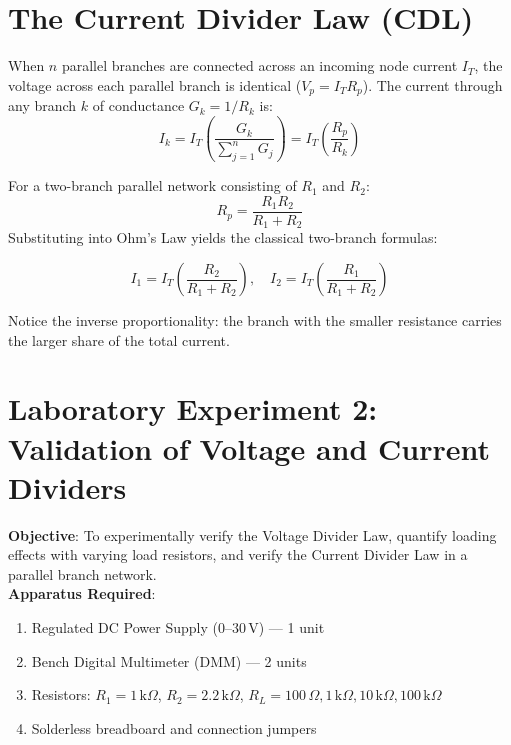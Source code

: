 \section{The Current Divider Law (CDL)}
\begin{definition}
When $n$ parallel branches are connected across an incoming node current $I_T$, the voltage across each parallel branch is identical ($V_p = I_T R_p$). The current through any branch $k$ of conductance $G_k = 1/R_k$ is:
\[ I_k = I_T \left( \frac{G_k}{\sum_{j=1}^n G_j} \right) = I_T \left( \frac{R_p}{R_k} \right) \]
\end{definition}

For a two-branch parallel network consisting of $R_1$ and $R_2$:
\[ R_p = \frac{R_1 R_2}{R_1 + R_2} \]
Substituting into Ohm's Law yields the classical two-branch formulas:
\begin{keyequation}
\[ I_1 = I_T \left( \frac{R_2}{R_1 + R_2} \right), \quad I_2 = I_T \left( \frac{R_1}{R_1 + R_2} \right) \]
\end{keyequation}
Notice the inverse proportionality: the branch with the smaller resistance carries the larger share of the total current.

\section{Laboratory Experiment 2: Validation of Voltage and Current Dividers}
\begin{experimentbox}
\textbf{Objective}: To experimentally verify the Voltage Divider Law, quantify loading effects with varying load resistors, and verify the Current Divider Law in a parallel branch network.\\
\textbf{Apparatus Required}:
\begin{enumerate}
    \item Regulated DC Power Supply ($0\text{--}30\,\mathrm{V}$) --- 1 unit
    \item Bench Digital Multimeter (DMM) --- 2 units
    \item Resistors: $R_1 = 1\,\mathrm{k}\Omega$, $R_2 = 2.2\,\mathrm{k}\Omega$, $R_L = 100\,\Omega, 1\,\mathrm{k}\Omega, 10\,\mathrm{k}\Omega, 100\,\mathrm{k}\Omega$
    \item Solderless breadboard and connection jumpers
\end{enumerate}
\end{experimentbox}

